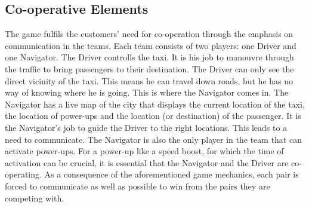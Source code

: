 \documentclass[11pt]{article}
\begin{document}
\subsection{Co-operative Elements}
The game fulfils the customers' need for co-operation through the emphasis on communication in the teams. Each team consists of two players: one Driver and one Navigator. The Driver controlls the taxi. It is his job to manouvre through the traffic to bring passengers to their destination. The Driver can only see the direct vicinity of the taxi. This means he can travel down roads, but he has no way of knowing where he is going. This is where the Navigator comes in. The Navigator has a live map of the city that displays the current location of the taxi, the location of power-ups and the location (or destination) of the passenger. It is the Navigator's job to guide the Driver to the right locations. This leads to a need to communicate. The Navigator is also the only player in the team that can activate power-ups. For a power-up like a speed boost, for which the time of activation can be crucial, it is essential that the Navigator and the Driver are co-operating. As a consequence of the aforementioned game mechanics, each pair is forced to communicate as well as possible to win from the pairs they are competing with.
\end{document}
